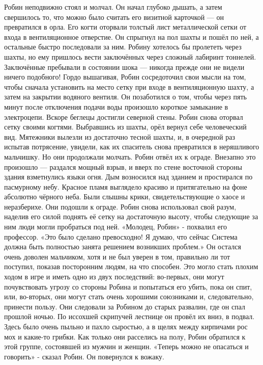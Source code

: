 \documentclass[a4paper,12pt]{book}
\begin{document}
	Робин неподвижно стоял и молчал. Он начал глубоко дышать, а затем свершилось то, что можно было считать его визитной карточкой — он превратился в орла. Его когти оторвали толстый лист металлической сетки от входа в вентиляционное отверстие. Он спрыгнул на пол шахты и пошёл по ней, а остальные быстро последовали за ним. Робину хотелось бы пролететь через шахты, но ему пришлось вести заключённых через сложный лабиринт тоннелей. Заключённые пребывали в состоянии шока — никогда прежде они не видели ничего подобного!
	Гордо вышагивая, Робин сосредоточил свои мысли на том, чтобы сначала установить на место сетку при входе в вентиляционную шахту, а затем на закрытии водяного вентиля. Он позаботился о том, чтобы через пять минут после отключения подачи воды произошло короткое замыкание в электроцепи.
	Вскоре беглецы достигли северной стены. Робин снова оторвал сетку своими когтями. Выбравшись из шахты, орёл вернул себе человеческий вид. Мятежники вылезли из достаточно тесной шахты, и, в очередной раз испытав потрясение, увидели, как их спаситель снова превратился в неряшливого мальчишку. Но они продолжали молчать. Робин отвёл их к ограде.
	Внезапно это произошло — раздался мощный взрыв, и вверх по стене восточной стороны здания взметнулись языки огня. Дым возносился над зданием и простирался по пасмурному небу. Красное пламя выглядело красиво и притягательно на фоне абсолютно чёрного неба. Были слышны крики, свидетельствующие о хаосе и неразберихе. 
	Они подошли к ограде. Робин снова использовал свой разум, наделив его силой поднять её сетку на достаточную высоту, чтобы следующие за ним люди могли пробраться под ней.
	«Молодец, Робин» - похвалил его профессор.
	«Это было сделано превосходно! Я думаю, что сейчас Система должна быть полностью занята решением возникших проблем.»
	Он остался очень доволен мальчиком, хотя и не был уверен в том, правильно ли тот поступил, показав посторонним людям, на что способен. Это могло стать плохим ходом в игре и иметь одно из двух последствий: во-первых, они могут почувствовать угрозу со стороны Робина и попытаться его убить, пока он спит, или, во-вторых, они могут стать очень хорошими союзниками и, следовательно, принести пользу.
	Они следовали за Робином до старых развалин, где он спал прошлой ночью. 
	По иссохшей скрипучей лестнице он провёл их вниз, в подвал. Здесь было очень пыльно и пахло сыростью, а в щелях между кирпичами рос мох и какие-то грибки.
	Как только они расселись на полу, Робин обратился к этой группе, состоявшей из мужчин и женщин.
	«Теперь можно не опасаться и говорить» - сказал Робин. Он повернулся к вожаку.
\end{document}
